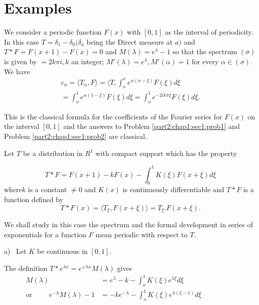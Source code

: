 \section{Examples}\label{part2:chap1:sec2}%

\begin{exam}\label{part2:chap1:sec2:exam1}%
  We consider a periodic function $F(x)$ with $[0, 1]$ as the interval
  of periodicity. In this case $T = \delta_1 - \delta_0 (\delta_a $
  being the Direct measure at $a)$ and $T \ast F = F (x + 1) - F(x) =
  0$ and $M(\lambda) = e^{\lambda} - 1$ so that the spectrum
  $(\sigma)$ is given by $= 2 k \pi i, k$ an integer; $M' (\lambda) =
  e^\lambda, M' (\alpha) = 1$ for every $\alpha \in (\sigma)$. We have
  \begin{multline*}
    c_\alpha =\langle T_\alpha, F \rangle = \langle T, \int^x_o e^{\alpha
      (x - \xi)} F (\xi) d \xi\\
    = \int^1_o e^{\alpha (1 - \xi)} F(\xi) d \xi = \int^1_o e^{-2 ik \pi
      \xi} F(\xi) d \xi. 
  \end{multline*}
\end{exam}

This is the classical formula for the coefficients of the Fourier
series for $F(x)$ on the interval $[0, 1]$ and the answers to Problem
\ref{part2:chap1:sec1:prob1} and Problem \ref{part2:chap1:sec1:prob2} are
classical.  

\begin{exam}\label{part2:chap1:sec2:exam2}%
  Let $T$ be a distribution in $R^1$ with compact support which has
  the property 
\end{exam}

\begin{equation*}
  T \ast F = F (x + 1) - k F(x) - \int^1_0 K(\xi) F (x + \xi)d \xi
  \tag{2}\label{part2:chap1:sec2:eq2} 
\end{equation*}
where\pageoriginale $k$ is a constant $\neq 0$ and $K(x)$ is continuously
differentiable and $T \ast F$ is a function defined by 
$$
T \ast F (x) = \langle T_\xi, F(x + \xi) \rangle = T_\xi. F(x + \xi).
$$

We shall study in this case the spectrum and the formal development in
series of exponentials for a function $F$ mean periodic with respect
to $T$. 

a)~  Let $K$ be continuous in $[0, 1]$.

The definition $T \ast e^{\lambda x} = e^{ + \lambda x} M(\lambda)$ gives
\begin{align*}
  M(\lambda) & = e^\lambda - k - \int^1_o K(\xi) e^{\lambda \xi} d \xi
  \tag{3}\label{part2:chap1:sec2:eq3}\\
  \text{or}\hspace{1cm} e^{-\lambda} M(\lambda) -1 & = - k
  e^{-\lambda} - \int^1_o K  (\xi) e^{\lambda (\xi  - 1)} d \xi\hspace{2cm}
\end{align*}

